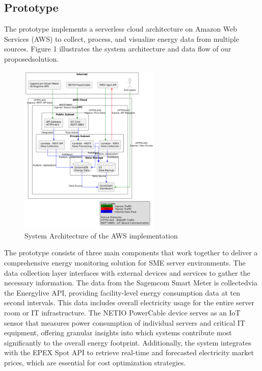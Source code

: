 \subsection{Prototype}
The prototype implements a serverless cloud architecture on Amazon Web Services (AWS) to collect,
process, and visualize energy data from multiple sources. Figure 1 illustrates the system
architecture and data flow of our proposedsolution.

\begin{figure}[htbp]
    \centering
    \includegraphics[width=0.6\textwidth]{fig/architecture2.png}
    \caption{System Architecture of the AWS implementation}
    \label{fig:architecture}
\end{figure}

The prototype consists of three main components that work together to deliver a comprehensive
energy monitoring solution for SME server environments. The data collection layer interfaces with
external devices and services to gather the necessary information. The data from the Sagemcom Smart
Meter is collectedvia the Energylive API, providing facility-level energy consumption data at
ten second intervals. This data includes overall electricity usage for the entire server room or IT
infrastructure. The NETIO PowerCable device serves as an IoT sensor that measures power consumption
of individual servers and critical IT equipment, offering granular insights into which systems
contribute most significantly to the overall energy footprint. Additionally, the system integrates
with the EPEX Spot API to retrieve real-time and forecasted electricity market prices, which
are essential for cost optimization strategies.

